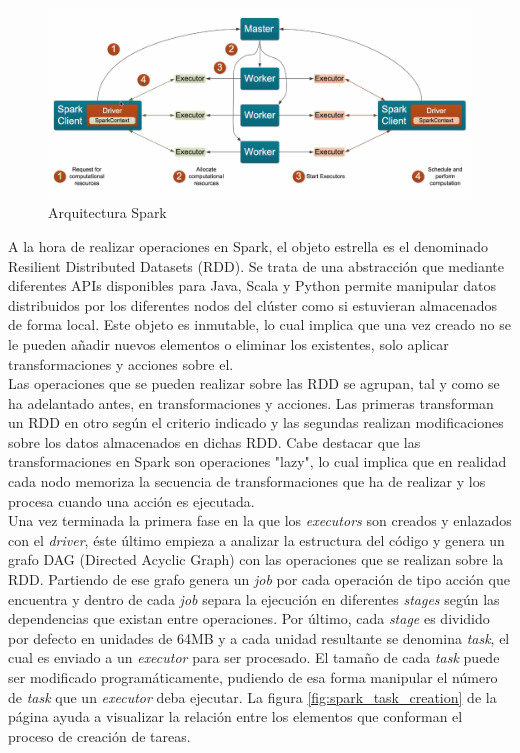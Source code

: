 \begin{figure}[h]
	\centering
	\includegraphics[width=1\textwidth]{Ilustraciones/spark_architecture.png}
	\caption{Arquitectura Spark}
	\label{fig:spark_initialization}
\end{figure}

A la hora de realizar operaciones en Spark, el objeto estrella es el denominado Resilient Distributed Datasets (RDD)\cite{zaharia2012resilient}. Se trata de una abstracción que mediante diferentes APIs disponibles para Java, Scala y Python permite manipular datos distribuidos por los diferentes nodos del clúster como si estuvieran almacenados de forma local. Este objeto es inmutable, lo cual implica que una vez creado no se le pueden añadir nuevos elementos o eliminar los existentes, solo aplicar transformaciones y acciones sobre el.\\

Las operaciones que se pueden realizar sobre las RDD se agrupan, tal y como se ha adelantado antes, en transformaciones y acciones. Las primeras transforman un RDD en otro según el criterio indicado y las segundas realizan modificaciones sobre los datos almacenados en dichas RDD. Cabe destacar que las transformaciones en Spark son operaciones "lazy", lo cual implica que en realidad cada nodo memoriza la secuencia de transformaciones que ha de realizar y los procesa cuando una acción es ejecutada.\\

Una vez terminada la primera fase en la que los \textit{executors} son creados y enlazados con el \textit{driver}, éste último empieza a analizar la estructura del código y genera un grafo DAG (Directed Acyclic Graph)\cite{thulasiraman19925}\cite{bang20082} con las operaciones que se realizan sobre la RDD. Partiendo de ese grafo genera un \textit{job} por cada operación de tipo acción que encuentra y dentro de cada \textit{job} separa la ejecución en diferentes \textit{stages} según las dependencias que existan entre operaciones. Por último, cada \textit{stage} es dividido por defecto en unidades de 64MB y a cada unidad resultante se denomina \textit{task}, el cual es enviado a un \textit{executor} para ser procesado. El tamaño de cada \textit{task} puede ser modificado programáticamente, pudiendo de esa forma manipular el número de \textit{task} que un \textit{executor} deba ejecutar. La figura \ref{fig:spark_task_creation} de la página \pageref{fig:spark_task_creation} ayuda a visualizar la relación entre los elementos que conforman el proceso de creación de tareas.

